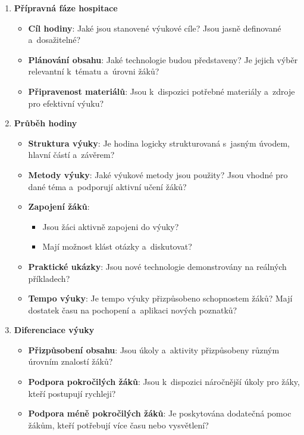 \begin{enumerate}
    \item \textbf{Přípravná fáze hospitace}
    \begin{itemize}
        \item \textbf{Cíl hodiny}: Jaké jsou stanovené výukové cíle? Jsou jasně definované a~dosažitelné?
        \item \textbf{Plánování obsahu}: Jaké technologie budou představeny? Je jejich výběr relevantní k~tématu a~úrovni žáků?
        \item \textbf{Připravenost materiálů}: Jsou k~dispozici potřebné materiály a~zdroje pro efektivní výuku?
    \end{itemize}

    \item \textbf{Průběh hodiny}
    \begin{itemize}
        \item \textbf{Struktura výuky}: Je hodina logicky strukturovaná s~jasným úvodem, hlavní částí a~závěrem?
        \item \textbf{Metody výuky}: Jaké výukové metody jsou použity? Jsou vhodné pro dané téma a~podporují aktivní učení žáků?
        \item \textbf{Zapojení žáků}:
        \begin{itemize}
            \item Jsou žáci aktivně zapojeni do výuky?
            \item Mají možnost klást otázky a~diskutovat?
        \end{itemize}
        \item \textbf{Praktické ukázky}: Jsou nové technologie demonstrovány na reálných příkladech?
        \item \textbf{Tempo výuky}: Je tempo výuky přizpůsobeno schopnostem žáků? Mají dostatek času na pochopení a~aplikaci nových poznatků?
    \end{itemize}

    \item \textbf{Diferenciace výuky}
    \begin{itemize}
        \item \textbf{Přizpůsobení obsahu}: Jsou úkoly a~aktivity přizpůsobeny různým úrovním znalostí žáků?
        \item \textbf{Podpora pokročilých žáků}: Jsou k~dispozici náročnější úkoly pro žáky, kteří postupují rychleji?
        \item \textbf{Podpora méně pokročilých žáků}: Je poskytována dodatečná pomoc žákům, kteří potřebují více času nebo vysvětlení?
    \end{itemize}


\end{enumerate}
